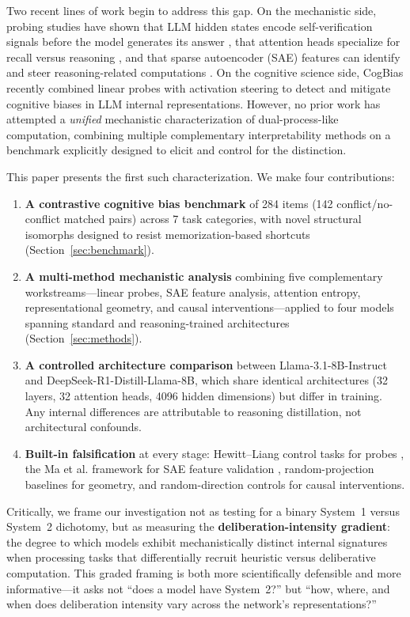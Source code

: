 Two recent lines of work begin to address this gap.  On the mechanistic side,
probing studies have shown that LLM hidden states encode self-verification
signals before the model generates its answer \citep{zhang2025probing}, that
attention heads specialize for recall versus reasoning
\citep{fartale2025recall}, and that sparse autoencoder (SAE) features can
identify and steer reasoning-related computations
\citep{fang2026sae, yang2026step, goodfire2025r1}.  On the cognitive science
side, CogBias \citep{huang2026cogbias} recently combined linear probes with
activation steering to detect and mitigate cognitive biases in LLM internal
representations.  However, no prior work has attempted a \emph{unified}
mechanistic characterization of dual-process-like computation, combining
multiple complementary interpretability methods on a benchmark explicitly
designed to elicit and control for the distinction.

This paper presents the first such characterization.  We make four
contributions:

\begin{enumerate}[leftmargin=*,itemsep=2pt]
  \item \textbf{A contrastive cognitive bias benchmark} of 284 items (142
  conflict/no-conflict matched pairs) across 7 task categories, with novel
  structural isomorphs designed to resist memorization-based shortcuts
  (Section~\ref{sec:benchmark}).

  \item \textbf{A multi-method mechanistic analysis} combining five
  complementary workstreams---linear probes, SAE feature analysis, attention
  entropy, representational geometry, and causal interventions---applied to four
  models spanning standard and reasoning-trained architectures
  (Section~\ref{sec:methods}).

  \item \textbf{A controlled architecture comparison} between
  Llama-3.1-8B-Instruct and DeepSeek-R1-Distill-Llama-8B, which share
  identical architectures (32 layers, 32 attention heads, 4096 hidden
  dimensions) but differ in training.  Any internal differences are attributable
  to reasoning distillation, not architectural confounds.

  \item \textbf{Built-in falsification} at every stage: Hewitt--Liang control
  tasks for probes \citep{hewitt2019control}, the Ma et al. framework for SAE
  feature validation \citep{ma2026falsification}, random-projection baselines
  for geometry, and random-direction controls for causal interventions.
\end{enumerate}

Critically, we frame our investigation not as testing for a binary System~1
versus System~2 dichotomy, but as measuring the \textbf{deliberation-intensity
gradient}: the degree to which models exhibit mechanistically distinct internal
signatures when processing tasks that differentially recruit heuristic versus
deliberative computation.  This graded framing is both more scientifically
defensible and more informative---it asks not ``does a model have System~2?''
but ``how, where, and when does deliberation intensity vary across the network's
representations?''

